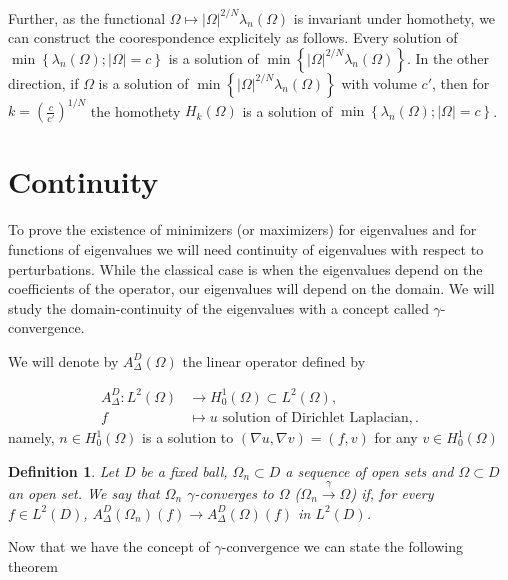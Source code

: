 \documentclass[12pt]{report}
\newtheorem{definition}{Definition}
\numberwithin{definition}{section}
\begin{document}
Further, as the functional $\Omega \mapsto | \Omega |^{2 / N} \lambda_{n}(\Omega) $ is invariant under homothety, we can construct the coorespondence explicitely as follows.
Every solution of $\min \left\{ \lambda_{n}(\Omega); |\Omega| = c \right\} $ is a solution of $\min \left\{ |\Omega|^{2/N}  \lambda_{n}(\Omega) \right\} $.
In the other direction, if $\Omega$ is a solution of $\min \left\{ |\Omega|^{2/N}  \lambda_{n}(\Omega) \right\} $ with volume $c'$, then for $k = \left( \frac{c}{c'} \right)^{1 / N}$ the homothety $H_{k}(\Omega)$ is a solution of $\min \left\{ \lambda_{n}(\Omega); |\Omega| = c \right\} $.

\break

\section{Continuity}
To prove the existence of minimizers (or maximizers) for eigenvalues and for functions of eigenvalues we will need continuity of eigenvalues with respect to perturbations.
While the classical case is when the eigenvalues depend on the coefficients of the operator, our eigenvalues will depend on the domain.
We will study the domain-continuity of the eigenvalues with a concept called $\gamma$-convergence.

We will denote by $A_{\Delta}^{D}(\Omega)$ the linear operator defined by 

\begin{align*}
  A_{\Delta}^{D} : L^{2}(\Omega) &\to H_{0}^{1}(\Omega) \subset L^{2}(\Omega), \\
  f &\mapsto u \text{ solution of Dirichlet Laplacian},
.\end{align*}
namely, $n \in H_{0}^{1}(\Omega)$ is a solution to $\left( \nabla u, \nabla v \right) = \left( f,v \right)$ for any $v \in H_{0}^{1}(\Omega)$

\begin{definition}
  Let $D$ be a fixed ball, $\Omega_{n} \subset D$ a sequence of open sets and $\Omega \subset D$ an open set.
  We say that $\Omega_{n}$ $\gamma$-converges to $\Omega$ ($\Omega_{n} \xrightarrow{\gamma} \Omega$) if, for every $f \in L^{2}(D)$, $A_{\Delta}^{D}(\Omega_{n})(f) \to A_{\Delta}^{D}(\Omega)(f)$ in $L^{2}(D)$.
\end{definition}

Now that we have the concept of $\gamma$-convergence we can state the following theorem \cite{convergence}
\end{document}
